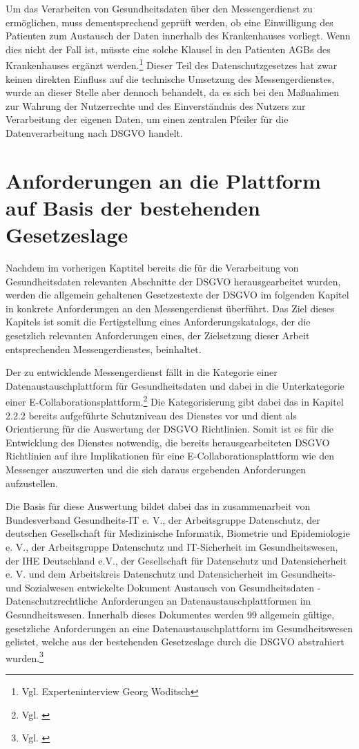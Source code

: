 Um das Verarbeiten von Gesundheitsdaten über den Messengerdienst zu ermöglichen, muss dementsprechend geprüft werden, ob eine Einwilligung des Patienten zum Austausch der Daten innerhalb des Krankenhauses vorliegt. Wenn dies nicht der Fall ist, müsste eine solche Klausel in den Patienten AGBs des Krankenhauses ergänzt werden.\footnote{Vgl. Experteninterview Georg Woditsch} Dieser Teil des Datenschutzgesetzes hat zwar keinen direkten Einfluss auf die technische Umsetzung des Messengerdienstes, wurde an dieser Stelle aber dennoch behandelt, da es sich bei den Maßnahmen zur Wahrung der Nutzerrechte und des Einverständnis des Nutzers zur Verarbeitung der eigenen Daten, um einen zentralen Pfeiler für die Datenverarbeitung nach DSGVO handelt.

\section{Anforderungen an die Plattform auf Basis der bestehenden Gesetzeslage}\label{section:aadpabsbg}
Nachdem im vorherigen Kaptitel bereits die für die Verarbeitung von Gesundheitsdaten relevanten Abschnitte der DSGVO herausgearbeitet wurden, werden die allgemein gehaltenen Gesetzestexte der DSGVO im folgenden Kapitel in konkrete Anforderungen an den Messengerdienst überführt.  Das Ziel dieses Kapitels ist somit die Fertigstellung eines Anforderungskatalogs, der die gesetzlich relevanten Anforderungen eines, der Zielsetzung dieser Arbeit entsprechenden Messengerdienstes, beinhaltet.

Der zu entwicklende Messengerdienst fällt in die Kategorie einer Datenaustauschplattform für Gesundheitsdaten und dabei in die Unterkategorie einer E-Collaborationsplattform.\footnote{Vgl. \cite[S. 14 ff.]{Bundesverband-Gesundheits-IT-e.V.2016}} Die Kategorisierung gibt dabei das in Kapitel 2.2.2 bereits aufgeführte Schutzniveau des Dienstes vor und dient als Orientierung für die Auswertung der DSGVO Richtlinien. Somit ist es für die Entwicklung des Dienstes notwendig, die bereits herausgearbeiteten DSGVO Richtlinien auf ihre Implikationen für eine E-Collaborationsplattform wie den Messenger auszuwerten und die sich daraus ergebenden Anforderungen aufzustellen. 

Die Basis für diese Auswertung bildet dabei das in zusammenarbeit von Bundesverband Gesundheits-IT e. V., der Arbeitsgruppe Datenschutz, der deutschen Gesellschaft für Medizinische Informatik, Biometrie und Epidemiologie e. V., der Arbeitsgruppe Datenschutz und IT-Sicherheit im Gesundheitswesen, der IHE Deutschland e.V., der Gesellschaft für Datenschutz und Datensicherheit e. V. und dem Arbeitskreis Datenschutz und Datensicherheit im Gesundheits- und Sozialwesen entwickelte Dokument \glqq Austausch von Gesundheitsdaten - Datenschutzrechtliche Anforderungen an Datenaustauschplattformen im Gesundheitswesen\grqq. Innerhalb dieses Dokumentes werden 99 allgemein gültige, gesetzliche Anforderungen an eine Datenaustauschplattform im Gesundheitswesen gelistet, welche aus der bestehenden Gesetzeslage durch die DSGVO abstrahiert wurden.\footnote{Vgl. \cite[S. 19 ff.]{Bundesverband-Gesundheits-IT-e.V.2016}}

